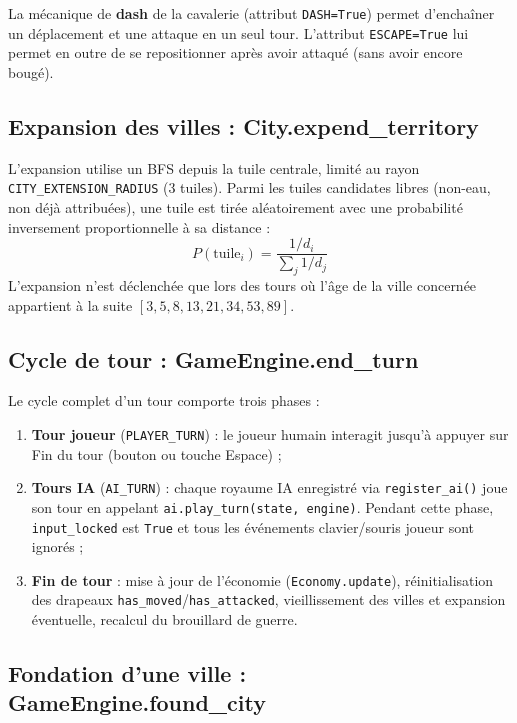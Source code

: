 \documentclass[12pt, a4paper]{article}
\begin{document}
La mécanique de \textbf{dash} de la cavalerie (attribut \texttt{DASH=True}) permet d'enchaîner
un déplacement et une attaque en un seul tour. L'attribut \texttt{ESCAPE=True} lui permet en
outre de se repositionner après avoir attaqué (sans avoir encore bougé).

\subsection{Expansion des villes : City.expend\_territory}

L'expansion utilise un BFS depuis la tuile centrale, limité au rayon \texttt{CITY\_EXTENSION\_RADIUS} (3 tuiles). Parmi les tuiles candidates libres (non-eau, non déjà attribuées), une tuile est tirée aléatoirement avec une probabilité inversement proportionnelle à sa distance :
\begin{equation}
    P(\text{tuile}_i) = \frac{1/d_i}{\displaystyle\sum_j 1/d_j}
\end{equation}
L'expansion n'est déclenchée que lors des tours où l'âge de la ville concernée appartient à la suite $[3, 5, 8, 13, 21, 34, 53, 89]$.

\subsection{Cycle de tour : GameEngine.end\_turn}

Le cycle complet d'un tour comporte trois phases :

\begin{enumerate}
    \item \textbf{Tour joueur} (\texttt{PLAYER\_TURN}) : le joueur humain interagit jusqu'à
    appuyer sur \og Fin du tour \fg{} (bouton ou touche Espace) ;
    \item \textbf{Tours IA} (\texttt{AI\_TURN}) : chaque royaume IA enregistré via
    \texttt{register\_ai()} joue son tour en appelant \texttt{ai.play\_turn(state, engine)}.
    Pendant cette phase, \texttt{input\_locked} est \texttt{True} et tous les événements
    clavier/souris joueur sont ignorés ;
    \item \textbf{Fin de tour} : mise à jour de l'économie (\texttt{Economy.update}),
    réinitialisation des drapeaux \texttt{has\_moved}/\texttt{has\_attacked}, vieillissement
    des villes et expansion éventuelle, recalcul du brouillard de guerre.
\end{enumerate}

\subsection{Fondation d'une ville : GameEngine.found\_city}
\end{document}
